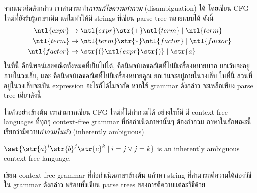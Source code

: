 \begin{example}
จากแนวคิดดังกล่าว เราสามารถทำ\emph{การแก้ไขความกำกวม} (disambiguation) ได้ โดยเขียน CFG ใหม่ที่ยังรับรู้ภาษาเดิม แต่ไม่ทำให้มี strings ที่เขียน parse tree หลายแบบได้ ดังนี้
\begin{align*}
\ntl{expr} &\to \ntl{expr}\str{+}\ntl{term} \mid \ntl{term} \\
\ntl{term} &\to \ntl{term}\str{*}\ntl{factor} \mid \ntl{factor} \\
\ntl{factor} &\to \str{(}\ntl{expr}\str{)} \mid \str{a}
\end{align*}
ในที่นี้  คือนิพจน์เลขคณิตทั้งหมดที่เป็นไปได้,  คือนิพจน์เลขคณิตที่ไม่มีเครื่องหมายบวก ยกเว้นจะอยู่ภายในวงเล็บ, และ  คือนิพจน์เลขคณิตที่ไม่มีเครื่องหมายคูณ ยกเว้นจะอยู่ภายในวงเล็บ \enskip ในที่นี้ ส่วนที่อยู่ในวงเล็บจะเป็น expression อะไรก็ได้ไม่จำกัด \enskip หากใช้ grammar ดังกล่าว  จะเหลือเพียง parse tree เดียวดังนี้
\begin{center}
\end{center}
\end{example}
ในตัวอย่างข้างต้น เราสามารถเขียน CFG ใหม่ที่ไม่กำกวมได้ อย่างไรก็ดี มี context-free languages ที่ทุกๆ context-free grammar ที่ก่อกำเนิดภาษานั้นๆ ต้องกำกวม \enskip ภาษาในลักษณะนี้เรียกว่ามีความ\emph{กำกวมในตัว} (inherently ambiguous)
%
\begin{example}
$\set{\str{a}^i\str{b}^j\str{c}^k\mid i=j \vee j=k}$ is an inherently ambiguous context-free language.
\end{example}

\begin{exercise}
    เขียน context-free grammar ที่ก่อกำเนิดภาษาข้างต้น แล้วหา string ที่สามารถตีความได้สองวิธีใน grammar ดังกล่าว พร้อมทั้งเขียน parse trees ของการตึความแต่ละวิธีด้วย
\end{exercise}

